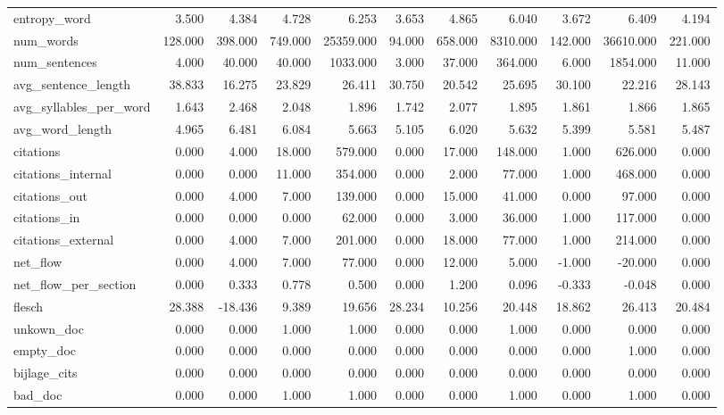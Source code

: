 \begin{tabular}{lrrrrrrrrrr}
\cline{1-11}
entropy\_word & 3.500 & 4.384 & 4.728 & 6.253 & 3.653 & 4.865 & 6.040 & 3.672 & 6.409 & 4.194 \\
\cline{1-11}
num\_words & 128.000 & 398.000 & 749.000 & 25359.000 & 94.000 & 658.000 & 8310.000 & 142.000 & 36610.000 & 221.000 \\
\cline{1-11}
num\_sentences & 4.000 & 40.000 & 40.000 & 1033.000 & 3.000 & 37.000 & 364.000 & 6.000 & 1854.000 & 11.000 \\
\cline{1-11}
avg\_sentence\_length & 38.833 & 16.275 & 23.829 & 26.411 & 30.750 & 20.542 & 25.695 & 30.100 & 22.216 & 28.143 \\
\cline{1-11}
avg\_syllables\_per\_word & 1.643 & 2.468 & 2.048 & 1.896 & 1.742 & 2.077 & 1.895 & 1.861 & 1.866 & 1.865 \\
\cline{1-11}
avg\_word\_length & 4.965 & 6.481 & 6.084 & 5.663 & 5.105 & 6.020 & 5.632 & 5.399 & 5.581 & 5.487 \\
\cline{1-11}
citations & 0.000 & 4.000 & 18.000 & 579.000 & 0.000 & 17.000 & 148.000 & 1.000 & 626.000 & 0.000 \\
\cline{1-11}
citations\_internal & 0.000 & 0.000 & 11.000 & 354.000 & 0.000 & 2.000 & 77.000 & 1.000 & 468.000 & 0.000 \\
\cline{1-11}
citations\_out & 0.000 & 4.000 & 7.000 & 139.000 & 0.000 & 15.000 & 41.000 & 0.000 & 97.000 & 0.000 \\
\cline{1-11}
citations\_in & 0.000 & 0.000 & 0.000 & 62.000 & 0.000 & 3.000 & 36.000 & 1.000 & 117.000 & 0.000 \\
\cline{1-11}
citations\_external & 0.000 & 4.000 & 7.000 & 201.000 & 0.000 & 18.000 & 77.000 & 1.000 & 214.000 & 0.000 \\
\cline{1-11}
net\_flow & 0.000 & 4.000 & 7.000 & 77.000 & 0.000 & 12.000 & 5.000 & -1.000 & -20.000 & 0.000 \\
\cline{1-11}
net\_flow\_per\_section & 0.000 & 0.333 & 0.778 & 0.500 & 0.000 & 1.200 & 0.096 & -0.333 & -0.048 & 0.000 \\
\cline{1-11}
flesch & 28.388 & -18.436 & 9.389 & 19.656 & 28.234 & 10.256 & 20.448 & 18.862 & 26.413 & 20.484 \\
\cline{1-11}
unkown\_doc & 0.000 & 0.000 & 1.000 & 1.000 & 0.000 & 0.000 & 1.000 & 0.000 & 0.000 & 0.000 \\
\cline{1-11}
empty\_doc & 0.000 & 0.000 & 0.000 & 0.000 & 0.000 & 0.000 & 0.000 & 0.000 & 1.000 & 0.000 \\
\cline{1-11}
bijlage\_cits & 0.000 & 0.000 & 0.000 & 0.000 & 0.000 & 0.000 & 0.000 & 0.000 & 0.000 & 0.000 \\
\cline{1-11}
bad\_doc & 0.000 & 0.000 & 1.000 & 1.000 & 0.000 & 0.000 & 1.000 & 0.000 & 1.000 & 0.000 \\
\cline{1-11}
\bottomrule
\end{tabular}
